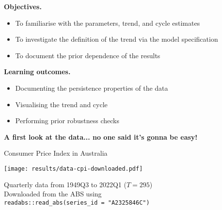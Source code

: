 \documentclass[notes,blackandwhite,mathsans,usenames,dvipsnames]{beamer}
\begin{document}
{
\begin{frame}

\bigskip\textbf{\color{mcxs1}Objectives.}
\begin{itemize}[label=$\blacktriangleright$]
\item {\color{mcxs1}To familiarise with the parameters, trend, and cycle estimates}
\item {\color{mcxs1}To investigate the definition of the trend via the model specification}
\item {\color{mcxs1}To document the prior dependence of the results}
\end{itemize}

\bigskip\textbf{\color{mcxs2}Learning outcomes.}
\begin{itemize}[label=$\blacktriangleright$]
\item {\color{mcxs2}Documenting the persistence properties of the data}
\item {\color{mcxs2}Visualising the trend and cycle}
\item {\color{mcxs2}Performing prior robustness checks}
\end{itemize}

\end{frame}
}




{
\begin{frame}

\begin{adjustwidth}{-0.5cm}{0cm}
\vspace{8.3cm}
\textbf{{\color{mcxs2}A first look at the data...} {\color{mcxs3}no one said it's gonna be easy!}}
\end{adjustwidth}

\end{frame}
}



\begin{frame}{Consumer Price Index in Australia}

\centering
\texttt{[image: results/data-cpi-downloaded.pdf]}

\bigskip\small{\color{mcxs2}
Quarterly data from 1949Q3 to 2022Q1 ($T=295$)\\ 
Downloaded from the ABS using }\\ \texttt{readabs::read\_abs(series\_id = "A2325846C")}

\end{frame}
\end{document}

